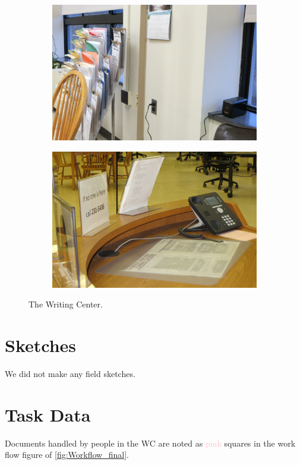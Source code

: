 \documentclass[12pt]{article} %
\begin{document}
\begin{samepage}
\begin{figure}[H]
\begin{subfigure}{.5\linewidth}
  \caption{}
  \label{fig:WC6}
  \end{subfigure}\\[1ex]
  \begin{subfigure}{.5\linewidth}
  \centering
  \includegraphics[width=0.75\linewidth]{WC7}
  \caption{}
  \label{fig:WC7}
  \end{subfigure}%
  \begin{subfigure}{.5\linewidth}
  \centering
  \includegraphics[width=0.75\linewidth]{WC8}
  \caption{}
  \label{fig:WC8}
  \end{subfigure}
  \caption{The Writing Center.}
  \label{fig:TheWritingCenter}
  \end{figure}
\end{samepage}

\section{Sketches} %
  We did not make any field sketches.

\section{Task Data} %
  Documents handled by people in the WC are noted as \textcolor{pink}{pink} squares in the work flow figure of \ref{fig:Workflow_final}.
\end{document}
